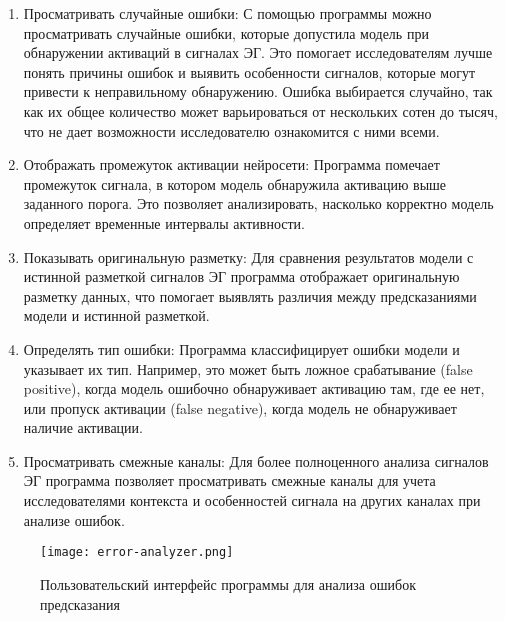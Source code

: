 \begin{enumerate}

	\item Просматривать случайные ошибки: С помощью программы можно
	просматривать случайные ошибки, которые допустила модель при обнаружении
	активаций в сигналах ЭГ. Это помогает исследователям лучше понять причины
	ошибок и выявить особенности сигналов, которые могут привести к
	неправильному обнаружению. Ошибка выбирается случайно, так как их общее
	количество может варьироваться от нескольких сотен до тысяч, что не дает
	возможности исследователю ознакомится с ними всеми.

	\item Отображать промежуток активации нейросети: Программа помечает
	промежуток сигнала, в котором модель обнаружила активацию выше заданного
	порога. Это позволяет анализировать, насколько корректно модель определяет
	временные интервалы активности.

	\item Показывать оригинальную разметку: Для сравнения результатов модели с
	истинной разметкой сигналов ЭГ программа отображает оригинальную разметку
	данных, что помогает выявлять различия между предсказаниями модели и
	истинной разметкой.

	\item Определять тип ошибки: Программа классифицирует ошибки модели и
	указывает их тип. Например, это может быть ложное срабатывание (false
	positive), когда модель ошибочно обнаруживает активацию там, где ее нет,
	или пропуск активации (false negative), когда модель не обнаруживает
	наличие активации.

	\item Просматривать смежные каналы: Для более полноценного анализа сигналов
	ЭГ программа позволяет просматривать смежные каналы для учета
	исследователями контекста и особенностей сигнала на других каналах при
	анализе ошибок.

\end{enumerate}


\begin{figure}[!htb]
	\centering
	\caption{Пользовательский интерфейс программы для анализа ошибок предсказания}
	\texttt{[image: error-analyzer.png]}
	\label{fig:error-analyser}
\end{figure}
